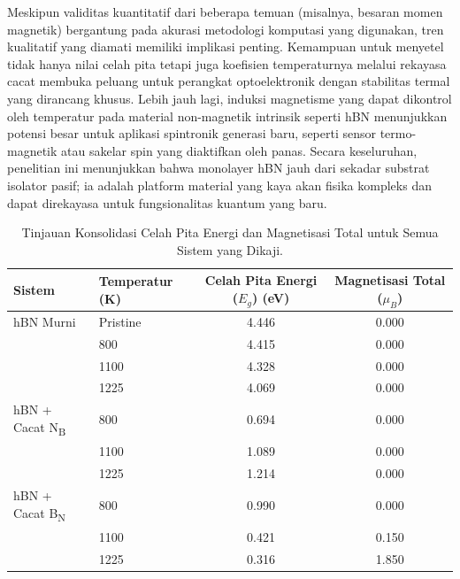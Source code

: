 Meskipun validitas kuantitatif dari beberapa temuan (misalnya, besaran momen magnetik) bergantung pada akurasi metodologi komputasi yang digunakan, tren kualitatif yang diamati memiliki implikasi penting.
Kemampuan untuk menyetel tidak hanya nilai celah pita tetapi juga koefisien temperaturnya melalui rekayasa cacat membuka peluang untuk perangkat optoelektronik dengan stabilitas termal yang dirancang khusus.
Lebih jauh lagi, induksi magnetisme yang dapat dikontrol oleh temperatur pada material non-magnetik intrinsik seperti hBN menunjukkan potensi besar untuk aplikasi spintronik generasi baru, seperti sensor termo-magnetik atau sakelar spin yang diaktifkan oleh panas.
Secara keseluruhan, penelitian ini menunjukkan bahwa monolayer hBN jauh dari sekadar substrat isolator pasif;
ia adalah platform material yang kaya akan fisika kompleks dan dapat direkayasa untuk fungsionalitas kuantum yang baru.
\begin{table}[htbp!] %
  \centering
  \caption{Tinjauan Konsolidasi Celah Pita Energi dan Magnetisasi Total untuk Semua Sistem yang Dikaji.}
  \label{tab:konsolidasi_eg_mag}
  \begin{tabular}{llcc}
    \toprule
    Sistem & Temperatur (K) & Celah Pita Energi ($E_g$) (eV) & Magnetisasi Total ($\mu_B$) \\
    \midrule
    hBN Murni & Pristine & 4.446 & 0.000 \\
              & 800      & 4.415 & 0.000 \\
              & 1100     & 4.328 & 0.000 \\
              & 1225     & 4.069 & 0.000 \\
    \midrule
    hBN + Cacat N\textsubscript{B} & 800  & 0.694 &  0.000 \\
                                  & 1100 & 1.089 &  0.000 \\
                                  & 1225 & 1.214 &  0.000 \\
    \midrule
    hBN + Cacat B\textsubscript{N} & 800  & 0.990 &  0.000 \\
                                  & 1100 & 0.421 &  0.150 \\
                                  & 1225 & 0.316 &  1.850 \\
    \bottomrule
  \end{tabular}
\end{table}